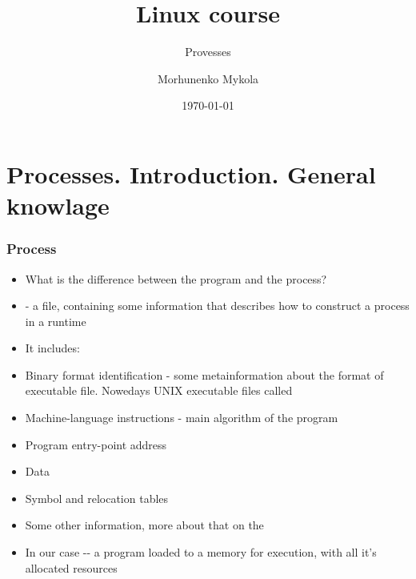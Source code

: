 \documentclass[usenames,dvipsnames,10pt,aspectratio=169]{beamer}
\title{Linux course}
\subtitle{Provesses}
\date[\today]{\small\today}
\author[Morhunenko Mykola]{Morhunenko Mykola}
\institute{APPS@UCU}
\begin{document}
\begin{frame}[noframenumbering]
\titlepage
\end{frame}

\begin{frame}{\contentsname}
    \tableofcontents
\end{frame}

\section{Processes. Introduction. General knowlage}
\begin{frame}
    \frametitle{Process}
    \begin{itemize}
        \item What is the difference between the program and the process?
        \item {}- a file, containing some information that describes how to construct a process in a runtime
        \item It includes:
        \item Binary format identification - some metainformation about the format of executable file. Nowedays UNIX executable files called
        \item Machine-language instructions - main algorithm of the program
        \item Program entry-point address
        \item Data
        \item Symbol and relocation tables
        \item Some other information, more about that on the
        \item In our case -- a program loaded to a memory for execution, with all it's allocated resources
    \end{itemize}
\end{frame}
\end{document}
